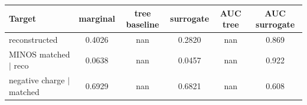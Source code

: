\begin{tabular}{lccccc}
\toprule
Target & marginal & tree baseline & surrogate & AUC tree & AUC surrogate \\
\midrule
reconstructed & 0.4026 & nan & 0.2820 & nan & 0.869 \\
MINOS matched $\mid$ reco & 0.0638 & nan & 0.0457 & nan & 0.922 \\
negative charge $\mid$ matched & 0.6929 & nan & 0.6821 & nan & 0.608 \\
\bottomrule
\end{tabular}
